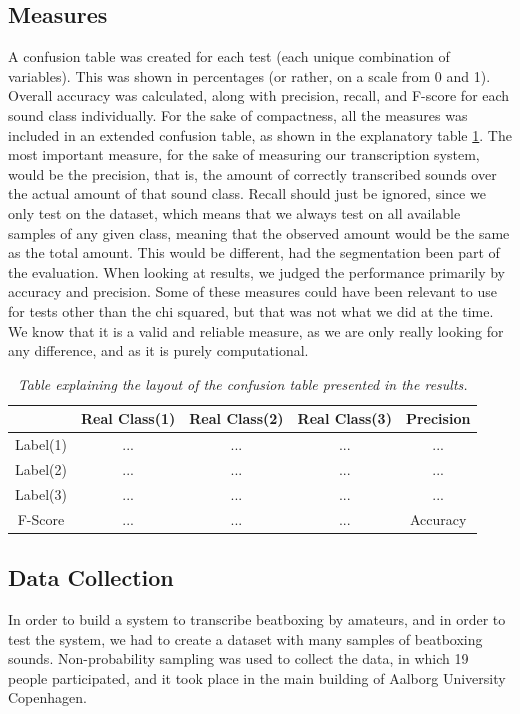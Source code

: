 	\subsection{Measures}
		A confusion table was created for each test (each unique combination of variables). This was shown in percentages (or rather, on a scale from 0 and 1). Overall accuracy was calculated, along with precision, recall, and F-score for each sound class individually. For the sake of compactness, all the measures was included in an extended confusion table, as shown in the explanatory table \ref{table:eval:explanatory}. 
		The most important measure, for the sake of measuring our transcription system, would be the precision, that is, the amount of correctly transcribed sounds over the actual amount of that sound class.
		Recall should just be ignored, since we only test on the dataset, which means that we always test on all available samples of any given class, meaning that the observed amount would be the same as the total amount. This would be different, had the segmentation been part of the evaluation. When looking at results, we judged the performance primarily by accuracy and precision. Some of these measures could have been relevant to use for tests other than the chi squared, but that was not what we did at the time. We know that it is a valid and reliable measure, as we are only really looking for any difference, and as it is purely computational.

			\begin{table}
				\centering
				\begin{tabular}{|c | c | c | c | c |}
					\hline
				 & Real Class(1) & Real Class(2) & Real Class(3) & Precision\\ \hline
					Label(1)  & ... & ... & ... & ...\\ \hline
					Label(2)  & ... & ... & ... & ...\\ \hline
					Label(3) & ... & ... & ... & ...\\ \hline
					F-Score & ... & ... & ... & Accuracy \\ \cline{1-4}
				\end{tabular}
				\caption{\textit{{\footnotesize Table explaining the layout of the confusion table presented in the results.}}}
				\label{table:eval:explanatory}
			\end{table}
		
		
	\subsection{Data Collection}
	\label{sec:data-collecting}
	In order to build a system to transcribe beatboxing by amateurs, and in order to test the system, we had to create a dataset with many samples of beatboxing sounds. 
	Non-probability sampling was used to collect the data, in which 19 people participated, and it took place in the main building of Aalborg University Copenhagen. 
	
